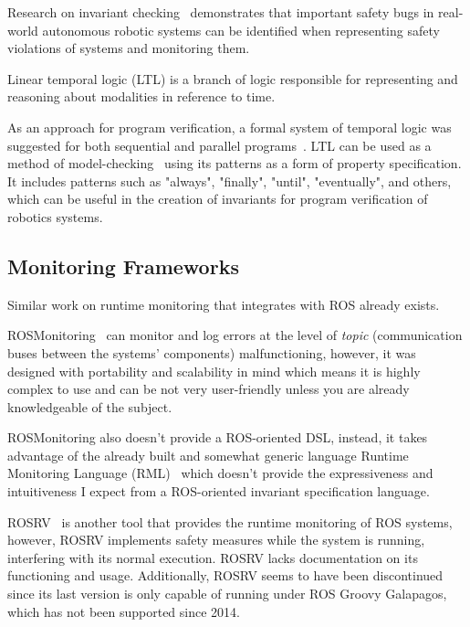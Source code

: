 Research on invariant checking~\cite{zizyte2021importance} demonstrates that important safety bugs in real-world autonomous robotic systems can be identified when representing safety violations of systems and monitoring them.

Linear temporal logic (LTL) is a branch of logic responsible for representing and reasoning about modalities in reference to time. 

As an approach for program verification, a formal system of temporal logic was suggested for both sequential and parallel programs~\cite{pnueli1977temporal}. LTL can be used as a method of model-checking~\cite{dwyer1998property} using its patterns as a form of property specification. It includes patterns such as "always", "finally", "until", "eventually", and others, which can be useful in the creation of invariants for program verification of robotics systems.


\subsection{Monitoring Frameworks}
\label{ssec:monitoringframeworks}

Similar work on runtime monitoring that integrates with ROS already exists. 

ROSMonitoring~\cite{ferrando2020rosmonitoring} can monitor and log errors at the level of \textit{topic} (communication buses between the systems' components) malfunctioning, however, it was designed with portability and scalability in mind which means it is highly complex to use and can be not very user-friendly unless you are already knowledgeable of the subject.

ROSMonitoring also doesn't provide a ROS-oriented DSL, instead, it takes advantage of the already built and somewhat generic language Runtime Monitoring Language (RML)~\cite{rml} which doesn't provide the expressiveness and intuitiveness I expect from a ROS-oriented invariant specification language. 

ROSRV~\cite{huang2014rosrv} is another tool that provides the runtime monitoring of ROS systems, however, ROSRV implements safety measures while the system is running, interfering with its normal execution. ROSRV lacks documentation on its functioning and usage. Additionally, ROSRV seems to have been discontinued since its last version is only capable of running under ROS Groovy Galapagos, which has not been supported since 2014.
